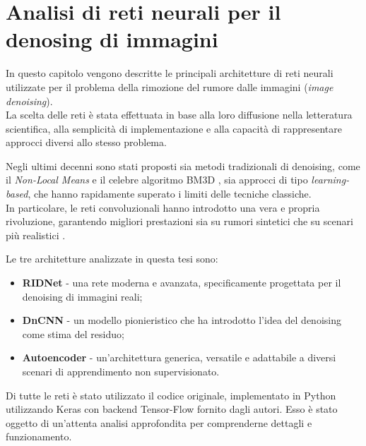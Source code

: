 \documentclass[12pt,a4paper,openright,twoside]{book}
\begin{document}
\chapter{Analisi di reti neurali per il denosing di immagini}
In questo capitolo vengono descritte le principali architetture di reti neurali utilizzate per il problema della rimozione del rumore dalle immagini (\textit{image denoising}).\\
La scelta delle reti è stata effettuata in base alla loro diffusione nella letteratura scientifica, alla semplicità di implementazione e alla capacità di rappresentare approcci diversi allo stesso problema.  

Negli ultimi decenni sono stati proposti sia metodi tradizionali di denoising, come il \textit{Non-Local Means} \parencite{buades2005nonlocal,buades2005nlmeans} e il celebre algoritmo BM3D \parencite{dabov2007bm3d}, sia approcci di tipo \textit{learning-based}, che hanno rapidamente superato i limiti delle tecniche classiche.  \\
In particolare, le reti convoluzionali hanno introdotto una vera e propria rivoluzione, garantendo migliori prestazioni sia su rumori sintetici che su scenari più realistici \parencite{zhang2017dncnn,zhang2018ffdnet,lehtinen2018noise2noise,batson2019noise2self}.

Le tre architetture analizzate in questa tesi sono:
\begin{itemize}
    \item \textbf{RIDNet} - una rete moderna e avanzata, specificamente progettata per il denoising di immagini reali;\parencite{9010324}
    \item \textbf{DnCNN} - un modello pionieristico che ha introdotto l'idea del denoising come stima del residuo;\parencite{zhang2017dncnn}
    \item \textbf{Autoencoder} - un'architettura generica, versatile e adattabile a diversi scenari di apprendimento non supervisionato.\parencite{vincent2008dae}
\end{itemize}
Di tutte le reti è stato utilizzato il codice originale, implementato in Python utilizzando Keras con backend Tensor-Flow fornito dagli autori. Esso è stato   oggetto di un'attenta analisi approfondita per comprenderne dettagli e funzionamento.
\end{document}
